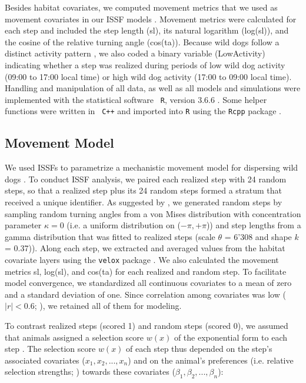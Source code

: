 \documentclass[abstract=on,10pt,a4paper,bibliography=totocnumbered]{article}
\begin{document}
Besides habitat covariates, we computed movement metrics that we used as
movement covariates in our ISSF models \citep{Avgar.2016, Fieberg.2020}.
Movement metrics were calculated for each step and included the step length
(\textsf{sl}), its natural logarithm (\textsf{log(sl)}), and the cosine of the
relative turning angle (\textsf{cos(ta)}). Because wild dogs follow a distinct
activity pattern \citep{Castello.2018}, we also coded a binary variable
(\textsf{LowActivity}) indicating whether a step was realized during periods of
low wild dog activity (09:00 to 17:00 local time) or high wild dog activity
(17:00 to 09:00 local time). Handling and manipulation of all data, as well as
all models and simulations were implemented with the statistical software {\tt
R}, version 3.6.6 \citep{R.2020}. Some helper functions were written in {\tt
C++} and imported into {\tt R} using the {\tt Rcpp} package
\citep{Eddelbuettel.2011, Eddelbuettel.2013}.

\subsection{Movement Model}
We used ISSFs to parametrize a mechanistic movement model for dispersing wild
dogs \citep{Avgar.2016}. To conduct ISSF analysis, we paired each realized step
with 24 random steps, so that a realized step plus its 24 random steps formed a
stratum that received a unique identifier. As suggested by \cite{Avgar.2016}, we
generated random steps by sampling random turning angles from a von Mises
distribution with concentration parameter \(\kappa = 0\) (i.e. a uniform
distribution on (\(-\pi, +\pi\))) and step lengths from a gamma distribution
that was fitted to realized steps (scale \(\theta\) = 6'308 and shape \(k\) =
0.37)). Along each step, we extracted and averaged values from the habitat
covariate layers using the {\tt velox} package \citep{Hunziker.2021}. We also
calculated the movement metrics \textsf{sl}, \textsf{log(sl)}, and
\textsf{cos(ta)} for each realized and random step. To facilitate model
convergence, we standardized all continuous covariates to a mean of zero and a
standard deviation of one. Since correlation among covariates was low (\(|r| <
0.6\); \citealp{Latham.2011}), we retained all of them for modeling.

To contrast realized steps (scored 1) and random steps (scored 0), we assumed
that animals assigned a selection score \(w(x)\) of the exponential form to each
step \citep{Fortin.2005}. The selection score \(w(x)\) of each step thus
depended on the step's associated covariates (\(x_1, x_2, ..., x_n\)) and on the
animal's preferences (i.e. relative selection strengths; \citealp{Avgar.2017})
towards these covariates (\(\beta_1, \beta_2, ..., \beta_n\)):
\end{document}
